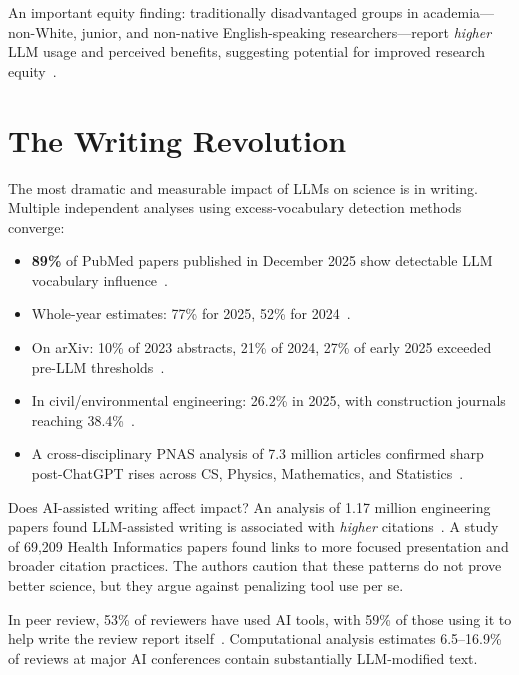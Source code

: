 \documentclass[11pt,a4paper]{article}
\begin{document}
An important equity finding: traditionally disadvantaged groups in academia---non-White, junior, and non-native English-speaking researchers---report \emph{higher} LLM usage and perceived benefits, suggesting potential for improved research equity~\cite{liao2024}.


\section{The Writing Revolution}
\label{sec:writing}

The most dramatic and measurable impact of LLMs on science is in writing. Multiple independent analyses using excess-vocabulary detection methods converge:

\begin{itemize}
\item \textbf{89\%} of PubMed papers published in December 2025 show detectable LLM vocabulary influence~\cite{tubingen2026}.
\item Whole-year estimates: 77\% for 2025, 52\% for 2024~\cite{tubingen2026}.
\item On arXiv: 10\% of 2023 abstracts, 21\% of 2024, 27\% of early 2025 exceeded pre-LLM thresholds~\cite{arxivwriting2025}.
\item In civil/environmental engineering: 26.2\% in 2025, with construction journals reaching 38.4\%~\cite{tubingen2026}.
\item A cross-disciplinary PNAS analysis of 7.3 million articles confirmed sharp post-ChatGPT rises across CS, Physics, Mathematics, and Statistics~\cite{pnas2026}.
\end{itemize}

Does AI-assisted writing affect impact? An analysis of 1.17 million engineering papers found LLM-assisted writing is associated with \emph{higher} citations~\cite{jinformatics2026}. A study of 69,209 Health Informatics papers found links to more focused presentation and broader citation practices. The authors caution that these patterns do not prove better science, but they argue against penalizing tool use per se.

In peer review, 53\% of reviewers have used AI tools, with 59\% of those using it to help write the review report itself~\cite{frontiersreview2025}. Computational analysis estimates 6.5--16.9\% of reviews at major AI conferences contain substantially LLM-modified text.
\end{document}
